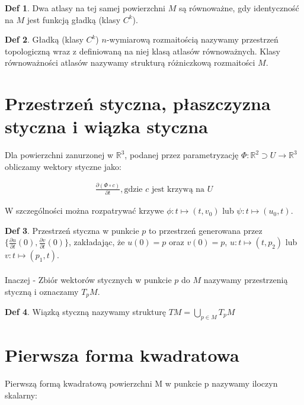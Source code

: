 \documentclass{article}
\theoremstyle{plain}
\theoremstyle{definition}
\newtheorem*{defi*}{Def}
\theoremstyle{definition}
\begin{document}
\begin{defi*}
Dwa atlasy na tej samej powierzchni $M$ są równoważne, gdy identyczność na $M$ jest funkcją gładką (klasy $C^k$).
\end{defi*}

\begin{defi*}
Gładką (klasy $C^k$) $n$-wymiarową rozmaitością nazywamy przestrzeń topologiczną wraz z definiowaną na niej klasą atlasów równoważnych. Klasy równoważności atlasów nazywamy strukturą różniczkową rozmaitości $M$.
\end{defi*}

\section{Przestrzeń styczna, płaszczyzna styczna i wiązka styczna}

Dla powierzchni zanurzonej w $\mathbb{R}^3$, podanej przez parametryzację $\Phi: \mathbb{R}^2 \supset U \to \mathbb{R}^3$ obliczamy wektory styczne jako:

\begin{align*}
    \frac{\partial(\Phi \circ c)}{\partial t}, \text{gdzie $c$ jest krzywą na $U$}
\end{align*}

\noindent W szczególności można rozpatrywać krzywe $\phi: t \mapsto (t, v_0)$ lub $\psi: t \mapsto (u_0, t)$.

\begin{defi*}
Przestrzeń styczna w punkcie $p$ to przestrzeń generowana przez $\{ \frac{\partial u}{\partial t}(0), \frac{\partial v}{\partial t}(0) \}$, zakładając, że $u(0) = p$ oraz $v(0) = p$,  $u: t \mapsto (t, p_2)$ lub $v: t \mapsto (p_1, t)$.
\\ \\
Inaczej - Zbiór wektorów stycznych w punkcie $p$ do $M$ nazywamy przestrzenią styczną i oznaczamy $T_pM$.
\end{defi*}

\begin{defi*}
Wiązką styczną nazywamy strukturę $TM = \bigcup_{p \in M} T_pM$
\end{defi*}

\section{Pierwsza forma kwadratowa}

Pierwszą formą kwadratową powierzchni M w punkcie p nazywamy iloczyn skalarny:
\end{document}
